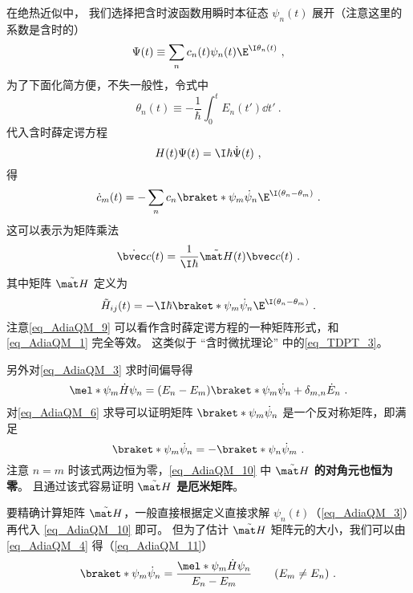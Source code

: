 在绝热近似中， 我们选择把含时波函数用瞬时本征态 $\psi_n(t)$ 展开（注意这里的系数是含时的）
\begin{equation}
\Psi(t) \equiv \sum_n c_n(t) \psi_n(t) \E^{\I \theta_n(t)}~,
\end{equation}
为了下面化简方便，不失一般性，令式中
\begin{equation}
\theta_n(t) \equiv -\frac{1}{\hbar} \int_0^t E_n(t')\dd{t'}~.
\end{equation}
代入含时薛定谔方程
\begin{equation}\label{eq_AdiaQM_1}
H(t)\Psi(t) = \I\hbar \dot \Psi(t)~,
\end{equation}
得
\begin{equation}\label{eq_AdiaQM_5}
\dot c_m(t) = -\sum_n c_n \braket*{\psi_m}{\dot\psi_n}\E^{\I(\theta_n-\theta_m)}~.
\end{equation}
这可以表示为矩阵乘法
\begin{equation}\label{eq_AdiaQM_9}
\dot{\bvec c}(t) = \frac{1}{\I\hbar}\tilde{\mat H}(t) \bvec c(t)~.
\end{equation}
其中矩阵 $\tilde{\mat H}$ 定义为
\begin{equation}\label{eq_AdiaQM_10}
\tilde H_{ij}(t) = -\I\hbar \braket*{\psi_m}{\dot\psi_n}\E^{\I(\theta_n-\theta_m)}~.
\end{equation}
注意\autoref{eq_AdiaQM_9} 可以看作含时薛定谔方程的一种矩阵形式，和\autoref{eq_AdiaQM_1} 完全等效。 这类似于 “含时微扰理论” 中的\autoref{eq_TDPT_3}。

另外对\autoref{eq_AdiaQM_3} 求时间偏导得
\begin{equation}\label{eq_AdiaQM_4}
\mel*{\psi_m}{\dot H}{\psi_n} = (E_n-E_m)\braket*{\psi_m}{\dot\psi_n} + \delta_{m,n}\dot E_n~.
\end{equation}
对\autoref{eq_AdiaQM_6} 求导可以证明矩阵 $\braket*{\psi_m}{\dot\psi_n}$ 是一个反对称矩阵，即满足
\begin{equation}\label{eq_AdiaQM_7}
\braket*{\psi_m}{\dot\psi_n} = -\braket*{\psi_n}{\dot\psi_m}~.
\end{equation}
注意 $n=m$ 时该式两边恒为零，\autoref{eq_AdiaQM_10} 中 \textbf{$\tilde{\mat H}$ 的对角元也恒为零}。 且通过该式容易证明 \textbf{$\tilde{\mat H}$ 是厄米矩阵}。

要精确计算矩阵 $\tilde{\mat H}$，一般直接根据定义直接求解 $\psi_n(t)$（\autoref{eq_AdiaQM_3}）再代入 \autoref{eq_AdiaQM_10} 即可。 但为了估计 $\tilde{\mat H}$ 矩阵元的大小，我们可以由\autoref{eq_AdiaQM_4} 得（\autoref{eq_AdiaQM_11}）
\begin{equation}
\braket*{\psi_m}{\dot\psi_n} = \frac{\mel*{\psi_m}{\dot H}{\psi_n}}{E_n-E_m} \qquad (E_m\ne E_n)~.
\end{equation}

